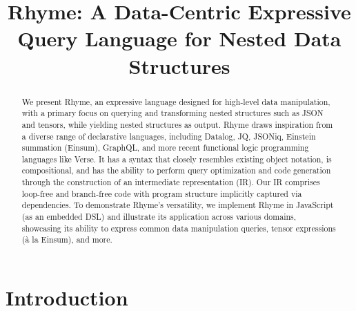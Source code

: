 \documentclass[runningheads]{llncs}
\newcommand{\lang}{Rhyme}
\begin{document}
%
\title{\lang{}: A Data-Centric Expressive Query Language for Nested Data Structures}

\author{}
\institute{}
%
%
%
\maketitle              %
\vspace{-12mm} %
%
\begin{abstract}
We present \lang{},
an expressive language
designed for high-level data manipulation, with a primary focus on querying
and transforming nested structures such as JSON and tensors,
while yielding nested structures as output.
\lang{} draws inspiration from a diverse range of declarative languages,
including Datalog, JQ, JSONiq, Einstein summation (Einsum), GraphQL, and more
recent functional logic programming languages like Verse.
It has a syntax that closely resembles existing object notation,
is compositional, and has the ability to perform query optimization and
code generation through the construction of an intermediate
representation (IR).
Our IR comprises loop-free and branch-free code with program structure
implicitly captured via dependencies.
To demonstrate \lang{}'s versatility, 
we implement \lang{} in JavaScript (as an embedded DSL) and 
illustrate its application
across various domains, showcasing its ability to express common
data manipulation queries, tensor expressions (à la Einsum), and more.
\end{abstract}
%
%
%
\section{Introduction}\label{sec:intro}
\end{document}
